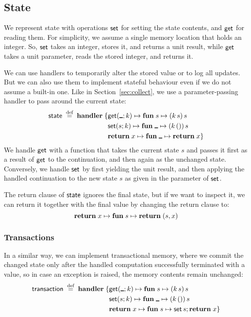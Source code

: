 \documentclass{article}
\begin{document}
\subsection{State}

We represent state with operations $\mathsf{set}$ for setting the state contents, and
$\mathsf{get}$ for reading them. For simplicity, we assume a single memory location that
holds an integer. So, $\mathsf{set}$ takes an integer, stores it, and returns a unit
result, while $\mathsf{get}$ takes a unit parameter, reads the stored integer, and
returns it.

We can use handlers to temporarily alter the stored value or to log all updates.
But we can also use them to implement stateful behaviour
even if we do not assume a built-in one. Like in Section~\ref{sec:collect},
we use a parameter-passing handler to pass around the current state:
%
\begin{align*}
  \kst{state} \defeq \handler \{
  &\opclause[\get]{\anon}{k} \fun{s} (k \, s) \, s \\
  &\opclause[\set]{s}{k} \fun{\anon} (k \, \unt) \, s \\
  &\retclause{x} \fun{\anon} \return x \}
\end{align*}
%
We handle $\mathsf{get}$ with a function that takes the current state $s$ and passes it
first as a result of $\mathsf{get}$ to the continuation, and then again as the unchanged
state. Conversely, we handle $\mathsf{set}$ by first yielding the unit result, and then
applying the handled continuation to the new state $s$ as given in the parameter
of $\mathsf{set}$.

The return clause of $\mathord{\mathsf{state}}$ ignores the final state, but if we want to
inspect it, we can return it together with the final value by changing the
return clause to:
\[
  \mathbf{return}\; x \mapsto \mathbf{fun}\; s \mapsto \mathbf{return}\; (s, x)
\]

\subsubsection{Transactions}

In a similar way, we can implement transactional memory, where we commit the
changed state only after the handled computation successfully terminated with a
value, so in case an exception is raised, the memory contents remain unchanged:
%
\begin{align*}
  \kst{transaction} \defeq \handler \{
  &\opclause[\get]{\anon}{k} \fun{s} (k \, s) \, s \\
  &\opclause[\set]{s}{k} \fun{\anon} (k \, \unt) \, s \\
  &\retclause{x} \fun{s} \set \, s; \return x
  \}
\end{align*}
\end{document}
